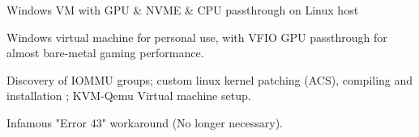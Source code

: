 \begin{cventries}
  \cventry
    {} %
    {Windows VM with GPU \& NVME \& CPU passthrough on Linux host} %
    {} %
    {} %
    {
      \begin{cvitems} %
        \item {Windows virtual machine for personal use, with VFIO GPU passthrough for almost bare-metal gaming performance.}
        \item {Discovery of IOMMU groups; custom linux kernel patching (ACS), compiling and installation ; KVM-Qemu Virtual machine setup.}
        \item {Infamous "Error 43" workaround (No longer necessary).\\}
      \end{cvitems}
    }

\end{cventries}
